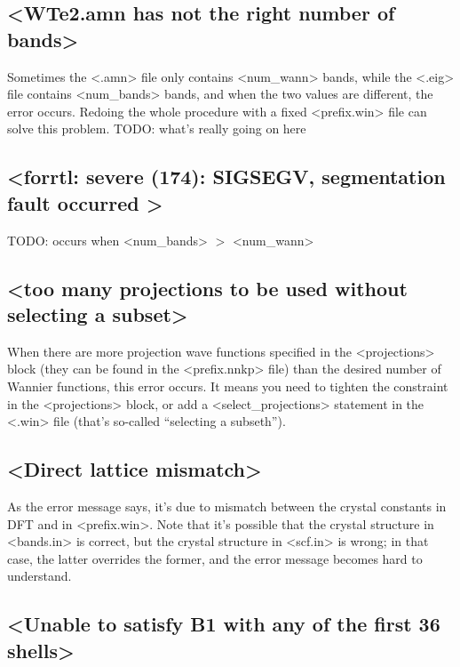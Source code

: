 \documentclass[hyperref, a4paper, 12pt]{report}
\def\texttt#1{<#1>}%
\newcommand{\shortcode}[1]{\texttt{#1}}
\begin{document}
\subsection{\shortcode{WTe2.amn has not the right number of bands}}

Sometimes the \shortcode{.amn} file only contains 
\shortcode{num_wann} bands,
while the \shortcode{.eig} file contains \shortcode{num_bands} bands,
and when the two values are different,
the error occurs. 
Redoing the whole procedure with a fixed \shortcode{prefix.win} file 
can solve this problem.
TODO: what's really going on here

\subsection{\shortcode{forrtl: severe (174): SIGSEGV, segmentation fault occurred }}

TODO: occurs when \shortcode{num_bands} $>$ \shortcode{num_wann}

\subsection{\shortcode{too many projections to be used without selecting a subset}}

When there are more 
projection wave functions specified in the \shortcode{projections} block 
(they can be found in the \shortcode{prefix.nnkp} file)
than the desired number of Wannier functions,
this error occurs.
It means you need to tighten the constraint in the \shortcode{projections} block, 
or add a \shortcode{select_projections} statement in the \shortcode{.win} file
(that's so-called ``selecting a subseth'').

\subsection{\shortcode{Direct lattice mismatch}}

As the error message says, 
it's due to mismatch between the crystal constants in DFT 
and in \shortcode{prefix.win}.
Note that it's possible that the crystal structure 
in \shortcode{bands.in} is correct, 
but the crystal structure in \shortcode{scf.in} is wrong; 
in that case, the latter overrides the former, 
and the error message becomes hard to understand. 

\subsection{\shortcode{Unable to satisfy B1 with any of the first  36 shells}}
\end{document}
